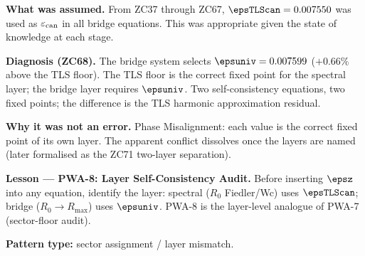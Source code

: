 \documentclass[12pt, a4paper]{article}
\renewcommand{\epscan}{\varepsilon_{\rm can}}
\begin{document}
\begin{derivedbox}[title={PM-ZC68-01: Two Self-Consistency Systems,
  Two Floors (Failure Stance) --- preserved from v1}]

\textbf{What was assumed.}
From ZC37 through ZC67, $\epsTLScan=0.007550$ was used as $\epscan$ in all
bridge equations. This was appropriate given the state of knowledge at
each stage.

\textbf{Diagnosis (ZC68).}
The bridge system selects $\epsuniv=0.007599$ ($+0.66\%$ above the TLS
floor). The TLS floor is the correct fixed point for the spectral layer;
the bridge layer requires $\epsuniv$. Two self-consistency equations,
two fixed points; the difference is the TLS harmonic approximation
residual.

\textbf{Why it was not an error.}
Phase Misalignment: each value is the correct fixed point of its own
layer. The apparent conflict dissolves once the layers are named
(later formalised as the ZC71 two-layer separation).

\textbf{Lesson --- PWA-8: Layer Self-Consistency Audit.}
Before inserting $\epsz$ into any equation, identify the layer:
spectral ($R_0$ Fiedler/Wc) uses $\epsTLScan$; bridge
($R_0\to R_{\max}$) uses $\epsuniv$. PWA-8 is the layer-level analogue
of PWA-7 (sector-floor audit).

\textbf{Pattern type:} sector assignment / layer mismatch.
\end{derivedbox}

\end{document}
